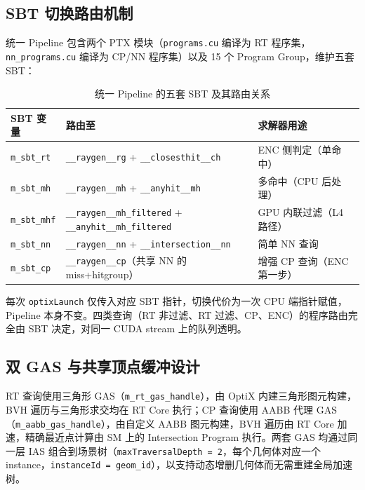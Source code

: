 \subsection{SBT 切换路由机制}

统一 Pipeline 包含两个 PTX 模块（\texttt{programs.cu} 编译为 RT 程序集，\texttt{nn\_programs.cu} 编译为 CP/NN 程序集）以及 15 个 Program Group，维护五套 SBT：

\begin{table}[htbp]
  \centering
  \small
  \caption{统一 Pipeline 的五套 SBT 及其路由关系}
  \label{tab:sbt_routing}
  \begin{tabular}{l p{5.5cm} l}
    \toprule
    SBT 变量 & 路由至 & 求解器用途 \\
    \midrule
    \texttt{m\_sbt\_rt}  & \texttt{\_\_raygen\_\_rg} + \texttt{\_\_closesthit\_\_ch}    & ENC 侧判定（单命中） \\
    \texttt{m\_sbt\_mh}  & \texttt{\_\_raygen\_\_mh} + \texttt{\_\_anyhit\_\_mh}       & 多命中（CPU 后处理） \\
    \texttt{m\_sbt\_mhf} & \texttt{\_\_raygen\_\_mh\_filtered} + \texttt{\_\_anyhit\_\_mh\_filtered} & GPU 内联过滤（L4 路径） \\
    \texttt{m\_sbt\_nn}  & \texttt{\_\_raygen\_\_nn} + \texttt{\_\_intersection\_\_nn}  & 简单 NN 查询 \\
    \texttt{m\_sbt\_cp}  & \texttt{\_\_raygen\_\_cp}（共享 NN 的 miss+hitgroup）        & 增强 CP 查询（ENC 第一步） \\
    \bottomrule
  \end{tabular}
\end{table}

每次 \texttt{optixLaunch} 仅传入对应 SBT 指针，切换代价为一次 CPU 端指针赋值，Pipeline 本身不变。四类查询（RT 非过滤、RT 过滤、CP、ENC）的程序路由完全由 SBT 决定，对同一 CUDA stream 上的队列透明。

\subsection{双 GAS 与共享顶点缓冲设计}

RT 查询使用三角形 GAS（\texttt{m\_rt\_gas\_handle}），由 OptiX 内建三角形图元构建，BVH 遍历与三角形求交均在 RT Core 执行；CP 查询使用 AABB 代理 GAS（\texttt{m\_aabb\_gas\_handle}），由自定义 AABB 图元构建，BVH 遍历由 RT Core 加速，精确最近点计算由 SM 上的 Intersection Program 执行。两套 GAS 均通过同一层 IAS 组合到场景树（\texttt{maxTraversalDepth = 2}，每个几何体对应一个 instance，\texttt{instanceId = geom\_id}），以支持动态增删几何体而无需重建全局加速树。

